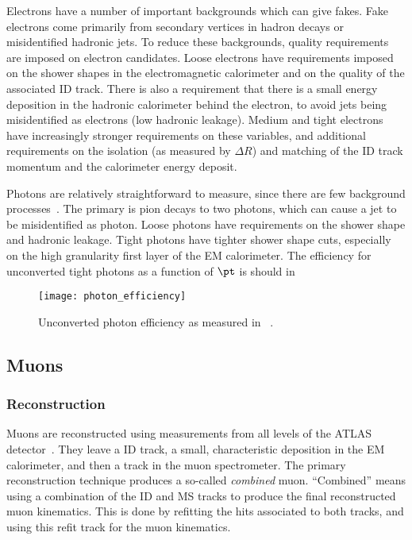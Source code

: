 Electrons have a number of important backgrounds which can give fakes.
Fake electrons come primarily from secondary vertices in hadron decays or misidentified hadronic jets.
To reduce these backgrounds, quality requirements are imposed on electron candidates.
Loose electrons have requirements imposed on the shower shapes in the electromagnetic calorimeter and on the quality of the associated ID track.
There is also a requirement that there is a small energy deposition in the hadronic calorimeter behind the electron, to avoid jets being misidentified as electrons (low hadronic leakage).
Medium and tight electrons have increasingly stronger requirements on these variables, and additional requirements on the isolation (as measured by $\Delta R$) and matching of the ID track momentum and the calorimeter energy deposit.

Photons are relatively straightforward to measure, since there are few background processes~\cite{ATL-PHYS-PUB-2016-015}.
The primary is pion decays to two photons, which can cause a jet to be misidentified as photon.
Loose photons have requirements on the shower shape and hadronic leakage.
Tight photons have tighter shower shape cuts, especially on the high granularity first layer of the EM calorimeter.
The efficiency for unconverted tight photons as a function of $\pt$ is should in
\begin{figure}
\caption{Unconverted photon efficiency as measured in ~\cite{ATL-PHYS-PUB-2016-015}.} \label{fig:photon_eff}
\texttt{[image: photon\_efficiency]}
\end{figure}

\subsection{Muons}

\subsubsection{Reconstruction}

Muons are reconstructed using measurements from all levels of the ATLAS detector~\cite{PERF-2015-10}.
They leave a ID track, a small, characteristic deposition in the EM calorimeter, and then a track in the muon spectrometer.
The primary reconstruction technique produces a so-called \textit{combined} muon.
``Combined'' means using a combination of the ID and MS tracks to produce the final reconstructed muon kinematics.
This is done by refitting the hits associated to both tracks, and using this refit track for the muon kinematics.

